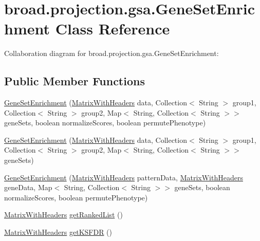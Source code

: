 \hypertarget{classbroad_1_1projection_1_1gsa_1_1_gene_set_enrichment}{\section{broad.\+projection.\+gsa.\+Gene\+Set\+Enrichment Class Reference}
\label{classbroad_1_1projection_1_1gsa_1_1_gene_set_enrichment}
}


Collaboration diagram for broad.\+projection.\+gsa.\+Gene\+Set\+Enrichment\+:
\subsection*{Public Member Functions}
\begin{DoxyCompactItemize}
\item 
\hyperlink{classbroad_1_1projection_1_1gsa_1_1_gene_set_enrichment_aa2889ec963f3f565fd36e5758b575162}{Gene\+Set\+Enrichment} (\hyperlink{classbroad_1_1core_1_1datastructures_1_1_matrix_with_headers}{Matrix\+With\+Headers} data, Collection$<$ String $>$ group1, Collection$<$ String $>$ group2, Map$<$ String, Collection$<$ String $>$$>$ gene\+Sets, boolean normalize\+Scores, boolean permute\+Phenotype)
\item 
\hyperlink{classbroad_1_1projection_1_1gsa_1_1_gene_set_enrichment_a99f07898930cc2795a919346dfd2409c}{Gene\+Set\+Enrichment} (\hyperlink{classbroad_1_1core_1_1datastructures_1_1_matrix_with_headers}{Matrix\+With\+Headers} data, Collection$<$ String $>$ group1, Collection$<$ String $>$ group2, Map$<$ String, Collection$<$ String $>$$>$ gene\+Sets)
\item 
\hyperlink{classbroad_1_1projection_1_1gsa_1_1_gene_set_enrichment_ab84fb104da81217cc81fe26ba44de4f9}{Gene\+Set\+Enrichment} (\hyperlink{classbroad_1_1core_1_1datastructures_1_1_matrix_with_headers}{Matrix\+With\+Headers} pattern\+Data, \hyperlink{classbroad_1_1core_1_1datastructures_1_1_matrix_with_headers}{Matrix\+With\+Headers} gene\+Data, Map$<$ String, Collection$<$ String $>$$>$ gene\+Sets, boolean normalize\+Scores, boolean permute\+Phenotype)
\item 
\hyperlink{classbroad_1_1core_1_1datastructures_1_1_matrix_with_headers}{Matrix\+With\+Headers} \hyperlink{classbroad_1_1projection_1_1gsa_1_1_gene_set_enrichment_addffe4a50dc870c52627c3302bedda9a}{get\+Ranked\+List} ()
\item 
\hyperlink{classbroad_1_1core_1_1datastructures_1_1_matrix_with_headers}{Matrix\+With\+Headers} \hyperlink{classbroad_1_1projection_1_1gsa_1_1_gene_set_enrichment_a9af8225e4a5a8eeabd5a164e35885226}{get\+K\+S\+F\+D\+R} ()
$$
\end{DoxyCompactItemize}
